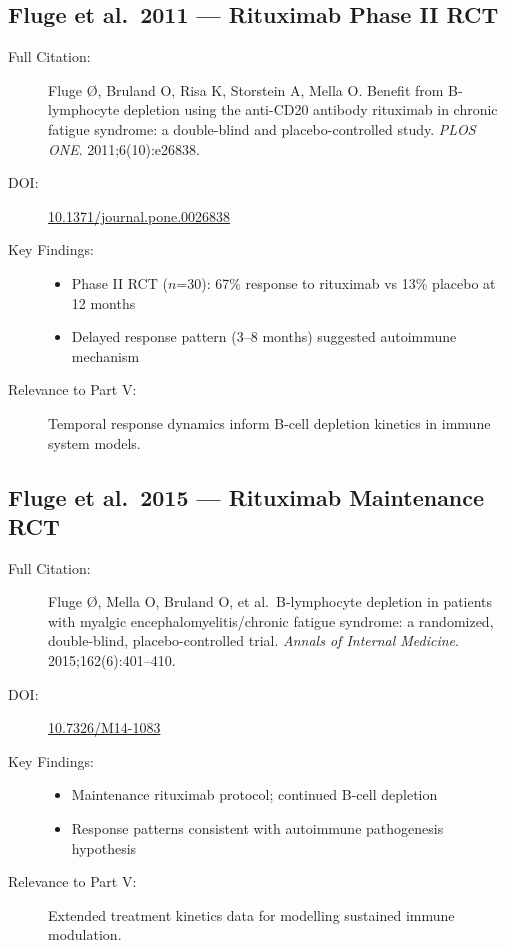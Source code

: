 \subsection{Fluge et al.\ 2011 --- Rituximab Phase II RCT}

\begin{description}
    \item[Full Citation:] Fluge {\O}, Bruland O, Risa K, Storstein A, Mella O. Benefit from B-lymphocyte depletion using the anti-CD20 antibody rituximab in chronic fatigue syndrome: a double-blind and placebo-controlled study. \textit{PLOS ONE}. 2011;6(10):e26838. \cite{Fluge2011rituximab}
    \item[DOI:] \href{https://doi.org/10.1371/journal.pone.0026838}{10.1371/journal.pone.0026838}
    \item[Key Findings:]
    \begin{itemize}
        \item Phase II RCT ($n$=30): 67\% response to rituximab vs 13\% placebo at 12 months
        \item Delayed response pattern (3--8 months) suggested autoimmune mechanism
    \end{itemize}
    \item[Relevance to Part V:] Temporal response dynamics inform B-cell depletion kinetics in immune system models.
\end{description}

\subsection{Fluge et al.\ 2015 --- Rituximab Maintenance RCT}

\begin{description}
    \item[Full Citation:] Fluge {\O}, Mella O, Bruland O, et al.\ B-lymphocyte depletion in patients with myalgic encephalomyelitis/chronic fatigue syndrome: a randomized, double-blind, placebo-controlled trial. \textit{Annals of Internal Medicine}. 2015;162(6):401--410. \cite{Fluge2015rituximab_rct}
    \item[DOI:] \href{https://doi.org/10.7326/M14-1083}{10.7326/M14-1083}
    \item[Key Findings:]
    \begin{itemize}
        \item Maintenance rituximab protocol; continued B-cell depletion
        \item Response patterns consistent with autoimmune pathogenesis hypothesis
    \end{itemize}
    \item[Relevance to Part V:] Extended treatment kinetics data for modelling sustained immune modulation.
\end{description}

